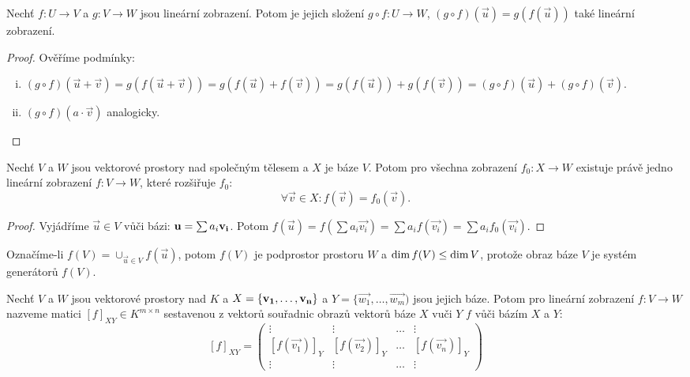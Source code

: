 \begin{observation}
    Nechť $f: U \rightarrow V$ a $g: V \rightarrow W$ jsou lineární 
    zobrazení. Potom je jejich složení $g \circ f: U \rightarrow W$, 
    $(g \circ f)(\vec{u}) = g(f(\vec{u}))$ také lineární zobrazení.
\end{observation}

\begin{proof}
    Ověříme podmínky:
    \begin{enumerate}[i.]
        \item $(g \circ f)(\vec{u} + \vec{v}) = g(f(\vec{u} + \vec{v})) =
            g(f(\vec{u}) + f(\vec{v})) = g(f(\vec{u})) + g(f(\vec{v})) =
            (g \circ f)(\vec{u}) + (g \circ f)(\vec{v}).$
        \item $(g \circ f)(a \cdot \vec{v})$ analogicky.
    \end{enumerate}
\end{proof}

\begin{theorem}
    Nechť $V$ a $W$ jsou vektorové prostory nad společným tělesem a $X$ je
    báze $V$. Potom pro všechna zobrazení $f_0: X \rightarrow W$ existuje
    právě jedno lineární zobrazení $f: V \rightarrow W$, které rozšiřuje
    $f_0$: 
    $$\forall \vec{v} \in X: f(\vec{v}) = f_0(\vec{v}).$$
\end{theorem}

\begin{proof}
    Vyjádříme $\vec{u} \in V$ vůči bázi: $\mathbf{u} = \sum a_i \mathbf{v_i}$. Potom
    $f(\vec{u}) = f(\sum a_i \vec{v_i}) = \sum a_i f(\vec{v_i}) = 
    \sum a_i f_0(\vec{v_i}).$
\end{proof}

\begin{corollary}
    Označíme-li $f(V) = \cup_{\vec{u} \in V} f(\vec{u})$, potom $f(V)$ je
    podprostor prostoru $W$ a $\mathop{\mathrm{dim}} f(V) \leq \mathop{\mathrm{dim}} V$, protože obraz
    báze $V$ je systém generátorů $f(V)$. 
\end{corollary}

\begin{definition}
    Nechť $V$ a $W$ jsou vektorové prostory nad $K$ a 
	$X = \{\mathbf{v_1}, \dots, \mathbf{v_n}\}$ a $Y = \{\vec{w_1}, \dots, \vec{w_m})$ 
	jsou jejich báze. Potom pro lineární zobrazení $f: V \rightarrow W$ 
	nazveme matici $[f]_{XY} \in K^{m\times n}$ sestavenou z vektorů 
	souřadnic obrazů vektorů báze $X$ vuči $Y$ 
     $f$ vůči bázím $X$ a $Y$:
    $$ [f]_{XY} = \begin{pmatrix}
        \vdots &\vdots &\dots &\vdots\\
        [f(\vec{v_1})]_Y &[f(\vec{v_2})]_Y &\dots &[f(\vec{v_n})]_Y \\
        \vdots &\vdots &\dots &\vdots 
    \end{pmatrix}$$
\end{definition}

